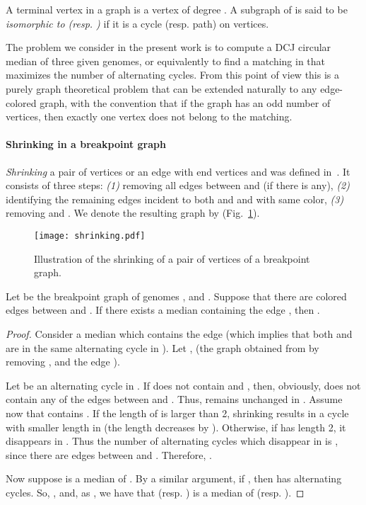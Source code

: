 \documentclass[10pt]{llncs}
\begin{document}
A terminal vertex in a graph is a vertex of degree . A subgraph of
 is said to be {\em isomorphic to  (resp. )} if it is a
cycle (resp. path) on  vertices.

\begin{remark}
The problem we consider in the present work is to compute a DCJ
circular median of three given genomes, or equivalently to find a
matching in  that maximizes the number of alternating cycles. From
this point of view this is a purely graph theoretical problem that can
be extended naturally to any edge-colored graph, with the convention
that if the graph has an odd number of vertices, then exactly one
vertex does not belong to the matching.
\end{remark}

\paragraph{Shrinking in a breakpoint graph}
{\em Shrinking} a pair of vertices  or an edge with end
vertices  and  was defined in~\cite{Xu2008}. It consists of
three steps: {\em (1)} removing all edges between  and  (if
there is any), {\em (2)} identifying the remaining edges incident to
both  and  and with same color, {\em (3)} removing  and
. We denote the resulting graph by 
(Fig.~\ref{shrink}).

\begin{figure}{
    \begin{center}
      \texttt{[image: shrinking.pdf]}
      \caption{Illustration of the shrinking of a pair  of
        vertices of a breakpoint graph.}
      \label{shrink}
    \end{center}
}\end{figure}



\begin{proposition} \label{Shrink}
  Let  be the breakpoint graph of genomes , and
  . Suppose that there are  colored edges between
   and . If there exists a median  containing the edge ,
  then .
\end{proposition}

\begin{proof} 
 Consider a median  which contains the edge  (which implies
 that both  and  are in the same alternating cycle in
 ). Let ,  (the graph
 obtained from  by removing ,  and the edge ).

 Let  be an alternating cycle in . If  does not contain 
 and , then, obviously,  does not contain any of the  edges
 between  and . Thus,  remains unchanged in . Assume
 now that  contains . If the length of  is larger than 2,
 shrinking  results in a cycle with smaller length in
  (the length decreases by ). Otherwise, if  has length
 2, it disappears in . Thus the number of alternating cycles
 which disappear in  is , since there are  edges
 between  and . Therefore, .
  
  Now suppose  is a median of .  By a similar argument, if , then  has 
  alternating cycles. So, , and, as , we
  have that  (resp. ) is a median of  (resp. ).  \end{proof}
\end{document}
